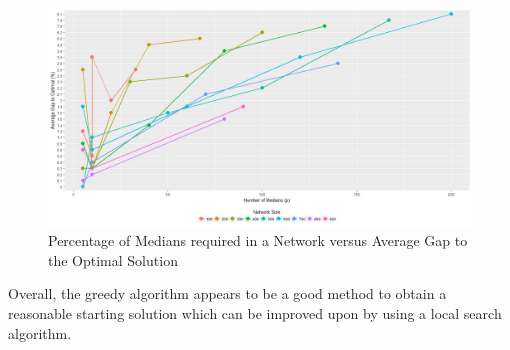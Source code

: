 \documentclass[11pt]{article}
\begin{document}
	\begin{figure}[H]
		\begin{center}
			\includegraphics[width=14cm]{medvsaccuracy_greedy.png}
			\caption{Percentage of Medians required in a Network versus Average Gap to the Optimal Solution}
			\label{medvsaccuracy_greedy}
		\end{center}
	\end{figure}
	
	Overall, the greedy algorithm appears to be a good method to obtain a reasonable starting solution which can be improved upon by using a local search algorithm.
	
\end{document}
